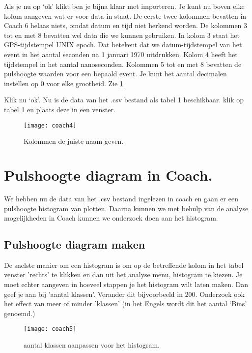 Als je nu op `ok' klikt ben je bijna klaar met importeren. Je kunt nu boven elke
kolom aangeven wat er voor data in staat. De eerste twee kolommen bevatten in Coach 6 
helaas niets, omdat datum en tijd niet herkend worden. De kolommen 3 tot en met 
8 bevatten wel data die we kunnen gebruiken. In kolom 3 staat het GPS-tijdstempel UNIX epoch.
Dat betekent dat we datum-tijdstempel van het event in het aantal seconden na 1 januari 1970 uitdrukken.
Kolom 4 heeft het tijdstempel in het aantal nanoseconden.
Kolommen 5 tot en met 8 bevatten de pulshoogte waarden voor een bepaald event.
Je kunt het aantal decimalen instellen op 0 voor elke grootheid. Zie \ref{fig:coach4} 

Klik nu `ok'. Nu is de data van het .csv bestand als tabel 1 beschikbaar.
klik op tabel 1 en plaats deze in een venster.

\begin{figure}
    \centering
    \texttt{[image: coach4]}
    \caption{Kolommen de juiste naam geven.}
    \label{fig:coach4}
\end{figure}


\section{Pulshoogte diagram in Coach.}

We hebben nu de data van het .csv bestand ingelezen in coach en gaan er een
pulshoogte histogram van plotten. Daarna kunnen we met behulp van de analyse 
mogelijkheden in Coach kunnen we onderzoek doen aan het histogram.

\subsection{Pulshoogte diagram maken}

De snelste manier om een histogram is om op de betreffende kolom in het tabel venster
'rechts' te klikken en dan uit het analyse menu, histogram te kiezen.
Je moet echter aangeven in hoeveel stappen je het histogram wilt laten maken.
Dan geef je aan bij 'aantal klassen'. Verander dit bijvoorbeeld in 200. Onderzoek
ook het effect van meer of minder 'klassen' (in het Engels wordt dit het aantal 
`Bins' genoemd.)

\begin{figure}
    \centering
    \texttt{[image: coach5]}
    \caption{aantal klassen aanpassen voor het histogram.}
    \label{fig:coach5}
\end{figure}

